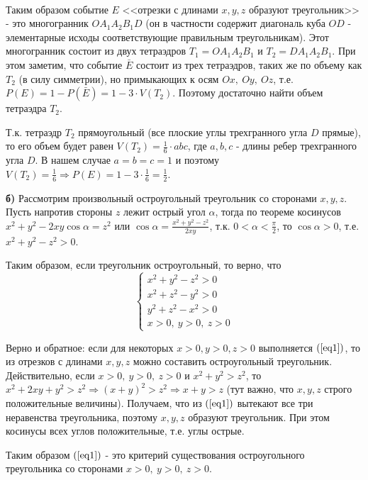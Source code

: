 \documentclass{article}
\begin{document}
\\
\par
Таким образом событие $E$ <<отрезки с длинами $x,y,z$ образуют треугольник>> - это многогранник $OA_1A_2B_1D$ (он в частности содержит диагональ куба $OD$ - элементарные исходы соответствующие правильным треугольникам). Этот многогранник состоит из двух тетраэдров $T_1=OA_1A_2B_1$ и $T_2=DA_1A_2B_1$. При этом заметим, что событие $\bar E$ состоит из трех тетраэдров, таких же по объему как $T_2$ (в силу симметрии), но примыкающих к осям $Ox,\ Oy,\ Oz$, т.е. $P(E)=1-P(\bar E)=1-3\cdot V(T_2)$. Поэтому достаточно найти объем тетраэдра $T_2$. 
\par
Т.к. тетраэдр $T_2$ прямоугольный (все плоские углы трехгранного угла $D$ прямые), то его объем будет равен $V(T_2)=\frac{1}{6}\cdot abc$, где $a,b,c$ - длины ребер трехгранного угла $D$. В нашем случае $a=b=c=1$ и поэтому $V(T_2)=\frac{1}{6}\Rightarrow P(E)=1-3\cdot\frac{1}{6}=\frac{1}{2}$.
\par
{\bf б)} Рассмотрим произвольный остроугольный треугольник со сторонами $x,y,z$. Пусть напротив стороны $z$ лежит острый угол $\alpha$, тогда по теореме косинусов $x^2+y^2-2xy\cos \alpha = z^2$ или $\cos \alpha = \frac{x^2+y^2-z^2}{2xy}$, т.к. $0< \alpha < \frac{\pi}{2}$, то $\cos \alpha > 0$, т.е. $x^2+y^2-z^2 > 0$. 
\par
Таким образом, если треугольник остроугольный, то верно, что
\begin{equation}\label{eq1}
 \begin{cases}
   x^2+y^2-z^2 > 0\\
   x^2+z^2-y^2 > 0\\
   y^2+z^2-x^2 > 0\\
   x > 0,\ y > 0,\ z > 0
 \end{cases}
\end{equation}
\par
Верно и обратное: если для некоторых $x>0,y>0,z>0$ выполняется $(\ref{eq1})$, то из отрезков с длинами $x,y,z$ можно составить остроугольный треугольник. Действительно, если $x > 0,\ y > 0,\ z > 0$ и $x^2+y^2 > z^2$, то $x^2+2xy+y^2 > z^2 \Rightarrow (x+y)^2 > z^2\Rightarrow x + y > z$ (тут важно, что $x,y,z$ строго положительные величины). Получаем, что из $(\ref{eq1})$  вытекают все три неравенства треугольника, поэтому $x,y,z$ образуют треугольник. При этом косинусы всех углов положительные, т.е. углы острые.
\par
Таким образом $(\ref{eq1})$ - это критерий существования остроугольного треугольника со сторонами $x > 0,\ y > 0,\ z > 0$.
\end{document}
